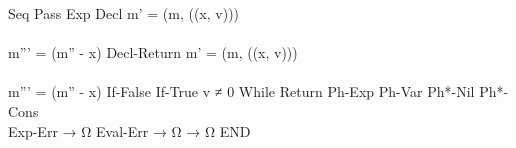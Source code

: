 {{{                  }
                  {}
    }
    {Seq}{ 
             {  }
             {  }
    }
    {Pass}{ 
              { }
              {  }
    }
    {Exp}{ 
             { }
             {  }
    }
    {Decl}{ 
            { m' = (m, ((x, v)))
           \\ 
           \\ m''' = (m'' - x)
            }
            {}
    } %
    {Decl-Return}{ 
            { m' = (m, ((x, v)))
           \\ 
           \\ m''' = (m'' - x)
            }
            { }
    } %
    {If-False}{ 
                  { }
                  {  }
    }
    {If-True}{ 
                 { v ≠ 0 }
                 {  }
    }
    {While}{ 
               { }
               { 
               }
    }
    {Return}{ 
              { }
              {  }
    }
    {Ph-Exp}{ 
                {}
                {}
            }
    {Ph-Var}{ 
                {}
                {}
    }
    {Ph*-Nil}{ 
                 { }
                 {}
    }
    {Ph*-Cons}{ 
                  { \\
                   }
                  {}
    }
    {Exp-Err}{ 
                 { }
                 {  → Ω }
    }
    {Eval-Err}{ 
                  {  → Ω }
                  {  → Ω }
    }
    {END}
}

\def\figctx{
  \begin{align*}
  \gramdef{Contextes}{C}
    { C_L }{}
    { \ctxOp{C}{e} }{}
    { \ctxOp{v}{C} }{}
    { \ctxUnOp{C} }{}
    { \ctxSet{C}{e} }{}
    { \ctxSet{φ}{C} }{}
    { \{ l_1:v_1 ; … ; l_i:C ; … ; l_n:e_n \} }{}
    { [ v_1 ; … ; C ; … ; e_n ] }{}
    { C (e_1, …, e_n) }{}
    { f (v_1, …, C, …, e_n) }{}
    {END}
  \\
  \gramdef{Contextes (left-values)}{C_L}
    { \ctxEmpty }{}
    { \ctxLvDeref{C_L} }{}
    { \ctxLvField{C_L}{l_S} }{}
    { \ctxLvIndex{C_L}{e} }{}
    { \ctxLvIndex{φ}{C} }{}
    {END}
  \\
  \gramdef{Contextes (instructions)}{C_I}
    { C_I;i }{}
    { \iIf{C}{i_1}{i_2} }{}
    { \iReturn{C} }{}
    { \iDecl{x}{C}{i} }{}
    { C }{}
    {END}
  \end{align*}
}
